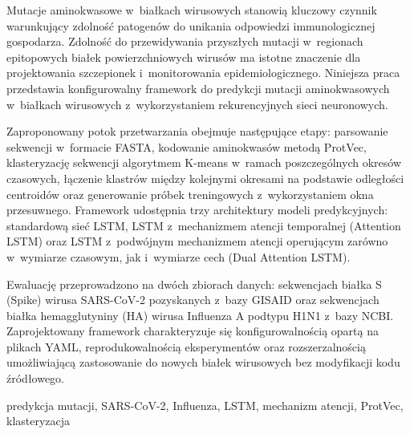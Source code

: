 \cleardoublepage %
\streszczenie

Mutacje aminokwasowe w~białkach wirusowych stanowią kluczowy czynnik warunkujący zdolność patogenów do unikania odpowiedzi immunologicznej gospodarza. Zdolność do przewidywania przyszłych mutacji w~regionach epitopowych białek powierzchniowych wirusów ma istotne znaczenie dla projektowania szczepionek i~monitorowania epidemiologicznego. Niniejsza praca przedstawia konfigurowalny framework do predykcji mutacji aminokwasowych w~białkach wirusowych z~wykorzystaniem rekurencyjnych sieci neuronowych.

Zaproponowany potok przetwarzania obejmuje następujące etapy: parsowanie sekwencji w~formacie FASTA, kodowanie aminokwasów metodą ProtVec, klasteryzację sekwencji algorytmem K-means w~ramach poszczególnych okresów czasowych, łączenie klastrów między kolejnymi okresami na podstawie odległości centroidów oraz generowanie próbek treningowych z~wykorzystaniem okna przesuwnego. Framework udostępnia trzy architektury modeli predykcyjnych: standardową sieć LSTM, LSTM z~mechanizmem atencji temporalnej (Attention LSTM) oraz LSTM z~podwójnym mechanizmem atencji operującym zarówno w~wymiarze czasowym, jak i~wymiarze cech (Dual Attention LSTM).

Ewaluację przeprowadzono na dwóch zbiorach danych: sekwencjach białka S (Spike) wirusa SARS-CoV-2 pozyskanych z~bazy GISAID oraz sekwencjach białka hemagglutyniny (HA) wirusa Influenza A podtypu H1N1 z~bazy NCBI.
Zaprojektowany framework charakteryzuje się konfigurowalnością opartą na plikach YAML, reprodukowalnością eksperymentów oraz rozszerzalnością umożliwiającą zastosowanie do nowych białek wirusowych bez modyfikacji kodu źródłowego.

\slowakluczowe predykcja mutacji, SARS-CoV-2, Influenza, LSTM, mechanizm atencji, ProtVec, klasteryzacja
